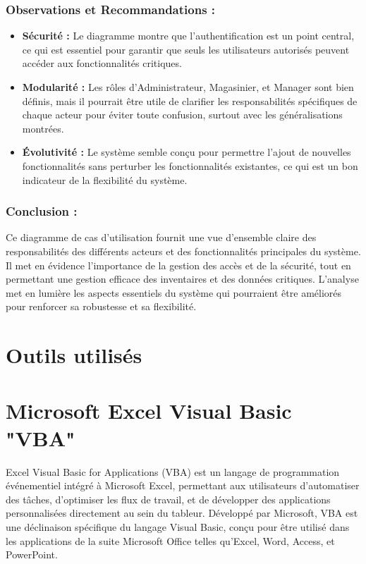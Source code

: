\documentclass[a4paper, oneside, 12pt, final]{extreport}
\begin{document}
\subsubsection{Observations et Recommandations :}
\begin{itemize}
\item \textbf{Sécurité :} Le diagramme montre que l'authentification est un point central, ce qui est essentiel pour garantir que seuls les utilisateurs autorisés peuvent accéder aux fonctionnalités critiques.
\item \textbf{Modularité :} Les rôles d'Administrateur, Magasinier, et Manager sont bien définis, mais il pourrait être utile de clarifier les responsabilités spécifiques de chaque acteur pour éviter toute confusion, surtout avec les généralisations montrées.
\item \textbf{Évolutivité :} Le système semble conçu pour permettre l'ajout de nouvelles fonctionnalités sans perturber les fonctionnalités existantes, ce qui est un bon indicateur de la flexibilité du système.
\end{itemize}
\subsubsection{Conclusion :}
Ce diagramme de cas d'utilisation fournit une vue d'ensemble claire des responsabilités des différents acteurs et des fonctionnalités principales du système. Il met en évidence l'importance de la gestion des accès et de la sécurité, tout en permettant une gestion efficace des inventaires et des données critiques. L'analyse met en lumière les aspects essentiels du système qui pourraient être améliorés pour renforcer sa robustesse et sa flexibilité.
\section{Outils utilisés}
\section{Microsoft Excel Visual Basic "VBA"}
Excel Visual Basic for Applications (VBA) est un langage de programmation événementiel intégré à Microsoft Excel, permettant aux utilisateurs d'automatiser des tâches, d'optimiser les flux de travail, et de développer des applications personnalisées directement au sein du tableur. Développé par Microsoft, VBA est une déclinaison spécifique du langage Visual Basic, conçu pour être utilisé dans les applications de la suite Microsoft Office telles qu'Excel, Word, Access, et PowerPoint.
\end{document}
